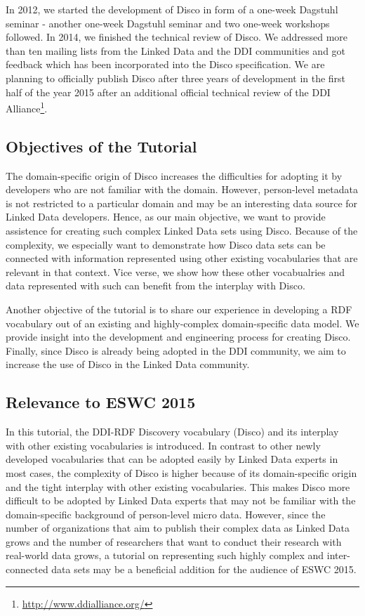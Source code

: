 \documentclass{llncs}
\begin{document}
In 2012, we started the development of Disco in form of a one-week Dagstuhl seminar - another one-week Dagstuhl seminar and two one-week workshops followed.  
In 2014, we finished the technical review of Disco.
We addressed more than ten mailing lists from the Linked Data and the DDI communities and got feedback which has been incorporated into the Disco specification.
We are planning to officially publish Disco after three years of development in the first half of the year 2015 after an additional official technical review of the DDI Alliance\footnote{\url{http://www.ddialliance.org/}}.

\subsection{Objectives of the Tutorial} 
The domain-specific origin of Disco increases the difficulties for adopting it by developers who are not familiar with the domain. However, person-level metadata is not restricted to a particular domain and may be an interesting data source for Linked Data developers. Hence, as our main objective, we want to provide assistence for creating such complex Linked Data sets using Disco. Because of the complexity, we especially want to demonstrate how Disco data sets can be connected with information represented using other existing vocabularies that are relevant in that context. Vice verse, we show how these other vocabualries and data represented with such can benefit from the interplay with Disco.

Another objective of the tutorial is to share our experience in developing a RDF vocabulary out of an existing and highly-complex domain-specific data model. We provide insight into the development and engineering process for creating Disco.
Finally, since Disco is already being adopted in the DDI community, we aim to increase the use of Disco in the Linked Data community.

\subsection{Relevance to ESWC 2015}
In this tutorial, the DDI-RDF Discovery vocabulary (Disco) and its interplay with other existing vocabularies is introduced. In contrast to other newly developed vocabularies that can be adopted easily by Linked Data experts in most cases, the complexity of Disco is higher because of its domain-specific origin and the tight interplay with other existing vocabularies. This makes Disco more difficult to be adopted by Linked Data experts that may not be familiar with the domain-specific background of person-level micro data. However, since the number of organizations that aim to publish their complex data as Linked Data grows and the number of researchers that want to conduct their research with real-world data grows, a tutorial on representing such highly complex and inter-connected data sets may be a beneficial addition for the audience of ESWC 2015.
\end{document}
